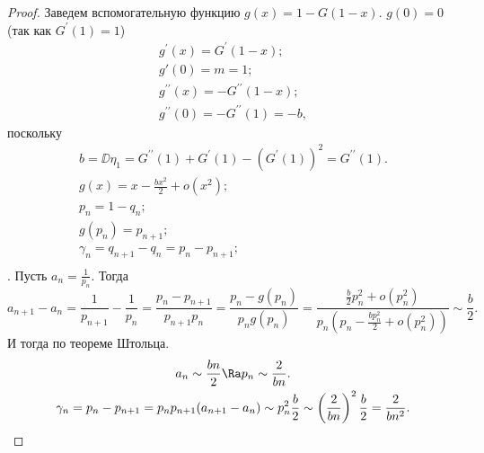  \begin{proof}
     Заведем вспомогательную функцию $g(x) = 1- G(1-x)$. $g(0) = 0$ (так как $G^\prime(1) = 1$)
    \begin{gather*}
        g^\prime(x) = G^\prime(1-x); \\
        g'(0) = m = 1;\\
        g^{\prime \prime}(x) = -G^{\prime \prime}(1-x);\\
        g^{\prime \prime}(0) = -G^{\prime \prime}(1) = -b,
    \end{gather*}
 поскольку
        \begin{gather*}
            b = \DD\eta_1 = G^{\prime \prime}(1) + G^\prime(1) - (G^\prime(1))^2 = G^{\prime \prime}(1).\\
            g(x) = x-\frac{bx^2}{2} + o(x^2);\\
            p_n = 1-q_n;\\ 
            g(p_n) = p_{n+1};\\
            \gamma_n = q_{n + 1} -q_n = p_n - p_{n+1};\\
        \end{gather*}.
     Пусть $a_n= \frac{1}{p_n}$. Тогда
     $$a_{n+1} - a_n = \frac{1}{p_{n+1}} -\frac{1}{p_n} = \frac{p_n - p_{n+1}}{p_{n+1}p_n} = \frac{p_n - g(p_n)}{p_ng(p_n)} = \frac{\frac{b}{2}p_n^2 + o(p_n^2)}{p_n(p_n - \frac{bp_n^2}{2} + o(p_n^2))}\sim \frac{b}{2}.$$
    И тогда по теореме Штольца.
    \begin{gather*}
        a_n\sim\frac{bn}{2} \Ra p_n \sim \frac{2}{bn}.\\
        \gamma_n = p_n - p_{n + 1} = p_np_{n+1} (a_{n+1} - a_n )\sim p_n^2\frac{b}{2} \sim \left(\frac{2}{bn}\right)^2\frac{b}{2} = \frac{2}{bn^2}.
    \end{gather*}
 \end{proof}

